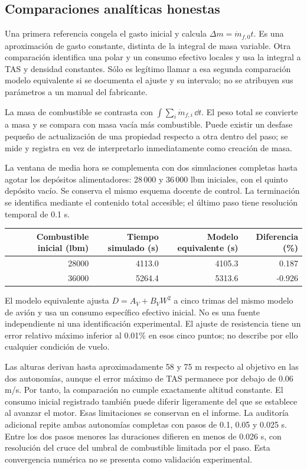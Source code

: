 \subsection{Comparaciones analíticas honestas}
Una primera referencia congela el gasto inicial y calcula $\Delta m=\dot m_{f,0}t$. Es una aproximación de gasto constante, distinta de la integral de masa variable. Otra comparación identifica una polar y un consumo efectivo locales y usa la integral a TAS y densidad constantes. Sólo es legítimo llamar a esa segunda comparación modelo equivalente si se documenta el ajuste y su intervalo; no se atribuyen sus parámetros a un manual del fabricante.

La masa de combustible se contrasta con $\int\sum_i\dot m_{f,i}\,\dd t$. El peso total se convierte a masa y se compara con masa vacía más combustible. Puede existir un desfase pequeño de actualización de una propiedad respecto a otra dentro del paso; se mide y registra en vez de interpretarlo inmediatamente como creación de masa.

La ventana de media hora se complementa con dos simulaciones completas hasta agotar los depósitos alimentadores: 28\,000 y 36\,000 lbm iniciales, con el quinto depósito vacío. Se conserva el mismo esquema docente de control. La terminación se identifica mediante el contenido total accesible; el último paso tiene resolución temporal de 0.1 s.

\begin{center}\begin{tabular}{rrrr}\toprule
Combustible inicial (lbm)&Tiempo simulado (s)&Modelo equivalente (s)&Diferencia (\%)\\\midrule
28000&4113.0&4105.3&0.187\\
36000&5264.4&5313.6&-0.926\\
\bottomrule\end{tabular}\end{center}
El modelo equivalente ajusta $D=A_V+B_VW^2$ a cinco trimas del mismo modelo de avión y usa un consumo específico efectivo inicial. No es una fuente independiente ni una identificación experimental. El ajuste de resistencia tiene un error relativo máximo inferior al 0.01\% en esos cinco puntos; no describe por ello cualquier condición de vuelo.

Las alturas derivan hasta aproximadamente 58 y 75 m respecto al objetivo en las dos autonomías, aunque el error máximo de TAS permanece por debajo de 0.06 m/s. Por tanto, la comparación no cumple exactamente altitud constante. El consumo inicial registrado también puede diferir ligeramente del que se establece al avanzar el motor. Esas limitaciones se conservan en el informe. La auditoría adicional repite ambas autonomías completas con pasos de 0.1, 0.05 y 0.025 s. Entre los dos pasos menores las duraciones difieren en menos de 0.026 s, con resolución del cruce del umbral de combustible limitada por el paso. Esta convergencia numérica no se presenta como validación experimental.

